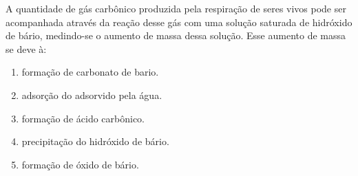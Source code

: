 A quantidade de gás carbônico produzida pela respiração de seres vivos pode ser acompanhada através da reação desse gás com uma solução saturada de hidróxido de bário, medindo-se o aumento de massa dessa solução.
Esse aumento de massa se deve à:

\begin{enumerate}[label = (\alph*)]
	\item formação de carbonato de bario.
	\item adsorção do  adsorvido pela água.
	\item formação de ácido carbônico.
	\item precipitação do hidróxido de bário.
	\item formação de óxido de bário.
\end{enumerate}

